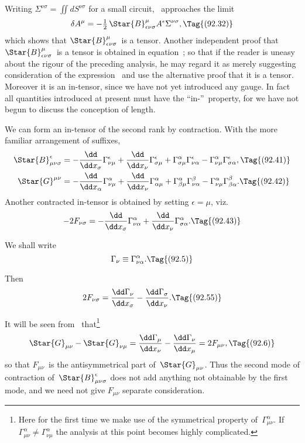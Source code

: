 \documentclass[12pt]{book}
\begin{document}
Writing $\Sigma^{\nu\sigma} = \iint dS^{\nu\sigma}$ for a small circuit, ~approaches the limit
\[
\delta A^{\mu} = -\tfrac{1}{2}\, \Star{B}_{\epsilon\nu\sigma}^{\mu} A^{\epsilon} \Sigma^{\nu\sigma},
\Tag{(92.32)}
\]
which shows that $\Star{B}_{\epsilon\nu\sigma}^{\mu}$~is a tensor\footnotemark.\footnotetext
  {Another independent proof that $\Star{B}_{\epsilon\nu\sigma}^{\mu}$~is a tensor is obtained in equation~; so that if
  the reader is uneasy about the rigour of the preceding analysis, he may regard it as merely
  suggesting consideration of the expression~ and use the alternative proof that it is a tensor.}
Moreover it is an in\hyp{}tensor, since we have
not yet introduced any gauge. In fact all quantities introduced at present
must have the ``in-''~property, for we have not begun to discuss the conception
of length.

We can form an in\hyp{}tensor of the second rank by contraction. With the
%
more familiar arrangement of suffixes,
\begin{align*}
  \Star{B}_{\mu\nu\sigma}^{\epsilon}
  &= -\frac{\dd}{\dd x_{\sigma}} \Gamma_{\nu\mu}^{\epsilon}
  + \frac{\dd}{\dd x_{\nu}} \Gamma_{\sigma\mu}^{\epsilon}
  + \Gamma_{\sigma\mu}^{\alpha} \Gamma_{\nu\alpha}^{\epsilon}
  - \Gamma_{\nu\mu}^{\alpha} \Gamma_{\sigma\alpha}^{\epsilon},
  \Tag{(92.41)} \\
  \Star{G}^{\mu\nu}
  &= -\frac{\dd}{\dd x_{\alpha}} \Gamma_{\nu\mu}^{\alpha}
  + \frac{\dd}{\dd x_{\nu}} \Gamma_{\alpha\mu}^{\alpha}
  + \Gamma_{\beta\mu}^{\alpha} \Gamma_{\nu\alpha}^{\beta}
  - \Gamma_{\nu\mu}^{\alpha} \Gamma_{\beta\alpha}^{\beta}.
  \Tag{(92.42)}
\end{align*}
Another contracted in\hyp{}tensor is obtained by setting $\epsilon = \mu$, viz.\
\[
-2F_{\nu\sigma}
= -\frac{\dd}{\dd x_{\sigma}} \Gamma_{\nu\alpha}^{\alpha}
+ \frac{\dd}{\dd x_{\nu}} \Gamma_{\sigma\alpha}^{\alpha}.
\Tag{(92.43)}
\]

We shall write
\[
\Gamma_{\nu} \equiv \Gamma_{\nu\alpha}^{\alpha}.
\Tag{(92.5)}
\]

Then
\[
2F_{\nu\sigma}
= \frac{\dd\Gamma_{\nu}}{\dd x_{\sigma}} - \frac{\dd\Gamma_{\sigma}}{\dd x_{\nu}}.
\Tag{(92.55)}
\]

It will be seen from~ that\footnote
  {Here for the first time we make use of the symmetrical property of~$\Gamma_{\mu\nu}^{\alpha}$. If $\Gamma_{\mu\nu}^{\alpha} \neq \Gamma_{\nu\mu}^{\alpha}$ the
  analysis at this point becomes highly complicated.}
\[
\Star{G}_{\mu\nu} - \Star{G}_{\nu\mu}
= \frac{\dd\Gamma_{\mu}}{\dd x_{\nu}} - \frac{\dd\Gamma_{\nu}}{\dd x_{\mu}}
= 2F_{\mu\nu},
\Tag{(92.6)}
\]
so that $F_{\mu\nu}$~is the antisymmetrical part of~$\Star{G}_{\mu\nu}$. Thus the second mode of
contraction of~$\Star{B}_{\mu\nu\sigma}^{\epsilon}$ does not add anything not obtainable by the first mode,
and we need not give $F_{\mu\nu}$ separate consideration.
\end{document}
